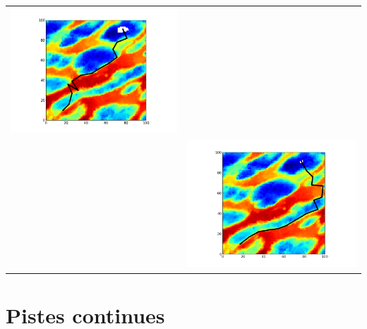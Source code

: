 \documentclass[11pt]{beamer}
\begin{document}
\begin{frame}[Résultats]
{\begin{tabular}{cc}
\includegraphics[scale=0.25]{../data/greedy/plot_A_10_17_B_91_77_iteration_015.png} \\
&\includegraphics[scale=0.25]{../data/None_dijkstra/plot_A_10_17_B_91_77_iteration_015.png} \\
\end{tabular}
}
\end{frame}
\section{Pistes continues}
\end{document}
